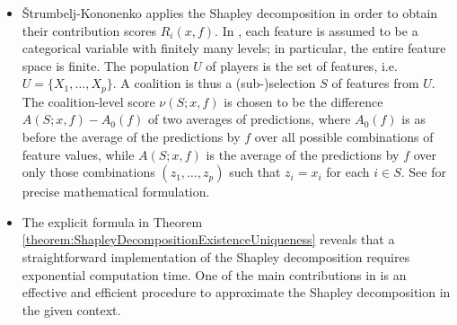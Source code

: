 \begin{itemize}
\begin{itemize}
	\item
		\v{S}trumbelj-Kononenko \cite{Strumbelj2010} applies
		the Shapley decomposition %
		in order to obtain their contribution scores $R_{i}(x,f)$.
		In \cite{Strumbelj2010},
		each feature is assumed to be a categorical variable with finitely many levels;
		in particular, the entire feature space is finite.
		The population $U$ of players is the set of features, i.e. $U = \{X_{1},\ldots,X_{p}\}$.
		A coalition is thus a (sub-)selection $S$ of features from $U$.
		The coalition-level score $\nu(S;x,f)$ is chosen to be the difference
		$A(S;x,f) - A_{0}(f)$
		of two averages of predictions, where $A_{0}(f)$ is as before
		the average of the predictions by $f$ over all possible combinations of feature values,
		while $A(S;x,f)$ is the average of the predictions by $f$ over only those combinations
		$(z_{1},\ldots,z_{p})$ such that $z_{i} = x_{i}$ for each $i \in S$.
		See \cite{Strumbelj2010} for precise mathematical formulation.

	\item
		The explicit formula in
		Theorem \ref{theorem:ShapleyDecompositionExistenceUniqueness}
		reveals that a straightforward implementation of the Shapley decomposition
		requires exponential computation time.
		One of the main contributions in \cite{Strumbelj2010} is
		an effective and efficient procedure to approximate
		the Shapley decomposition in the given context.


\end{itemize}
\end{itemize}
